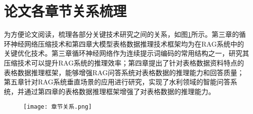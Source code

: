 \section{论文各章节关系梳理}

为方便论文阅读，梳理各部分关键技术研究之间的关系，如图\ref{fig:章节架构}所示。第三章的循环神经网络压缩技术和第四章大模型表格数据推理技术框架均为在RAG系统中的关键优化技术。第三章循环神经网络作为连续提示词编码的常用结构之一，研究其压缩技术可以提升RAG系统的推理效率；第四章提出了针对表格数据资料特点的表格数据推理框架，能够增强RAG问答系统对表格数据的推理能力和回答质量；
第五章针对RAG系统垂直场景的应用进行研究，实现了水利领域的智能问答系统，并通过第四章的表格数据推理框架增强了对表格数据的推理能力。
\begin{figure}[h]
  \centering
  \texttt{[image: 章节关系.png]}
  \label{fig:章节架构}
\end{figure}
\label{sec:first}












